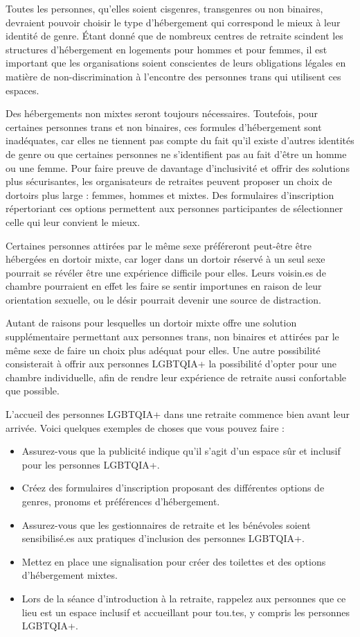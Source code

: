 \documentclass[12pt,openany]{book}
\begin{document}
Toutes les personnes, qu’elles soient cisgenres, transgenres ou non binaires, devraient pouvoir choisir le type d’hébergement qui correspond le mieux à leur identité de genre.
Étant donné que de nombreux centres de retraite scindent les structures d’hébergement en logements pour hommes et pour femmes, il est important que les organisations soient conscientes de leurs obligations légales en matière de non-discrimination à l’encontre des personnes trans qui utilisent ces espaces.

Des hébergements non mixtes seront toujours nécessaires. Toutefois, pour certaines personnes trans et non binaires, ces formules d’hébergement sont inadéquates, car elles ne tiennent pas compte du fait qu’il existe d’autres identités de genre ou que certaines personnes ne s’identifient pas au fait d’être un homme ou une femme. Pour faire preuve de davantage d’inclusivité et offrir des solutions plus sécurisantes, les organisateurs de retraites peuvent proposer un choix de dortoirs plus large : femmes, hommes et mixtes. Des formulaires d’inscription répertoriant ces options permettent aux personnes participantes de sélectionner celle qui leur convient le mieux.

Certaines personnes attirées par le même sexe préféreront peut-être être hébergées en dortoir mixte, car loger dans un dortoir réservé à un seul sexe pourrait se révéler être une expérience difficile pour elles. Leurs voisin.es de chambre pourraient en effet les faire se sentir importunes en raison de leur orientation sexuelle, ou le désir pourrait devenir une source de distraction.

Autant de raisons pour lesquelles un dortoir mixte offre une solution supplémentaire permettant aux personnes trans, non binaires et attirées par le même sexe de faire un choix plus adéquat pour elles. Une autre possibilité consisterait à offrir aux personnes \mbox{LGBTQIA+} la possibilité d’opter pour une chambre individuelle, afin de rendre leur expérience de retraite aussi confortable que possible.

L’accueil des personnes \mbox{LGBTQIA+} dans une retraite commence bien avant leur arrivée. Voici quelques exemples de choses que vous pouvez faire :

\begin{itemize}[label=\textbullet]
  \setlength\itemsep{-0.3em}
  \item Assurez-vous que la publicité indique qu’il s’agit d’un espace sûr et inclusif pour les personnes \mbox{LGBTQIA+}.
  \item Créez des formulaires d’inscription proposant des différentes options de genres, pronoms et préférences d’hébergement.
  \item Assurez-vous que les gestionnaires de retraite et les bénévoles soient sensibilisé.es aux pratiques d’inclusion des personnes \mbox{LGBTQIA+}.
  \item Mettez en place une signalisation pour créer des toilettes et des options d’hébergement mixtes.
  \item Lors de la séance d’introduction à la retraite, rappelez aux personnes que ce lieu est un espace inclusif et accueillant pour tou.tes, y compris les personnes \mbox{LGBTQIA+}.
\end{itemize}
\end{document}
